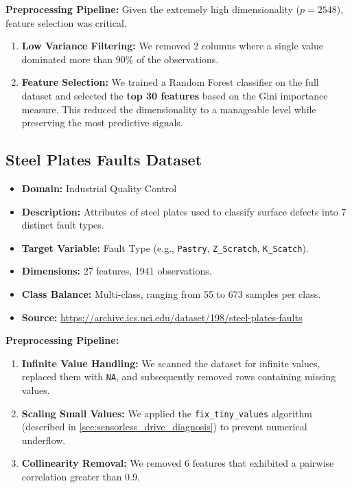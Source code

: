\documentclass[a4paper,11pt,twoside]{report}
\theoremstyle{definition}
\begin{document}
\textbf{Preprocessing Pipeline:}
Given the extremely high dimensionality ($p=2548$), feature selection was critical.
\begin{enumerate}
    \item \textbf{Low Variance Filtering:} We removed 2 columns where a single value dominated more than 90\% of the observations.
    \item \textbf{Feature Selection:} We trained a Random Forest classifier on the full dataset and selected the \textbf{top 30 features} based on the Gini importance measure. This reduced the dimensionality to a manageable level while preserving the most predictive signals.
\end{enumerate}

\subsection{Steel Plates Faults Dataset}

\begin{itemize}
    \item \textbf{Domain:} Industrial Quality Control
    \item \textbf{Description:} Attributes of steel plates used to classify surface defects into 7 distinct fault types.
    \item \textbf{Target Variable:} Fault Type (e.g., \texttt{Pastry}, \texttt{Z\_Scratch}, \texttt{K\_Scatch}).
    \item \textbf{Dimensions:} 27 features, 1941 observations.
    \item \textbf{Class Balance:} Multi-class, ranging from 55 to 673 samples per class.
    \item \textbf{Source:} \url{https://archive.ics.uci.edu/dataset/198/steel-plates-faults}~\cite{steel_plates_faults_198}
\end{itemize}

\textbf{Preprocessing Pipeline:}
\begin{enumerate}
    \item \textbf{Infinite Value Handling:} We scanned the dataset for infinite values, replaced them with \texttt{NA}, and subsequently removed rows containing missing values.
    \item \textbf{Scaling Small Values:} We applied the \texttt{fix\_tiny\_values} algorithm (described in \ref{sec:sensorless_drive_diagnosis}) to prevent numerical underflow.
    \item \textbf{Collinearity Removal:} We removed 6 features that exhibited a pairwise correlation greater than 0.9.
\end{enumerate}
\end{document}
